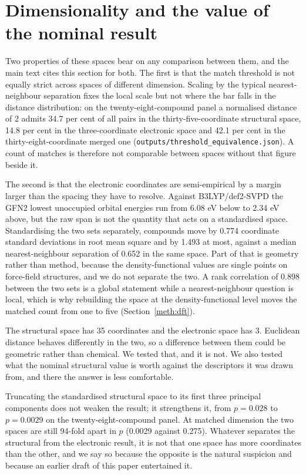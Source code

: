 \documentclass[11pt,a4paper]{article}
\begin{document}
\section{Dimensionality and the value of the nominal result}
\label{res:dimdetail}

Two properties of these spaces bear on any comparison between them, and the main
text cites this section for both. The first is that the match threshold is not
equally strict across spaces of different dimension. Scaling by the typical
nearest-neighbour separation fixes the local scale but not where the bar falls
in the distance distribution: on the twenty-eight-compound panel a normalised
distance of 2 admits 34.7 per cent of all pairs in the thirty-five-coordinate
structural space, 14.8 per cent in the three-coordinate electronic space and
42.1 per cent in the thirty-eight-coordinate merged one
(\texttt{outputs/\allowbreak threshold\_\allowbreak equivalence.json}). A count of matches is therefore
not comparable between spaces without that figure beside it.

The second is that the electronic coordinates are semi-empirical by a margin
larger than the spacing they have to resolve. Against B3LYP/def2-SVPD the GFN2
lowest unoccupied orbital energies run from 6.08 eV below to 2.34 eV above, but
the raw span is not the quantity that acts on a standardised space. Standardising
the two sets separately, compounds move by 0.774 coordinate standard deviations
in root mean square and by 1.493 at most, against a median nearest-neighbour
separation of 0.652 in the same space. Part of that is geometry rather than
method, because the density-functional values are single points on force-field
structures, and we do not separate the two. A rank correlation of 0.898 between
the two sets is a global statement while a nearest-neighbour question is local,
which is why rebuilding the space at the density-functional level moves the
matched count from one to five (Section~\ref{meth:dft}).

The structural space has 35 coordinates and the electronic space has 3. Euclidean
distance behaves differently in the two, so a difference between them could be
geometric rather than chemical. We tested that, and it is not. We also tested
what the nominal structural value is worth against the descriptors it was drawn
from, and there the answer is less comfortable.

Truncating the standardised structural space to its first three principal
components does not weaken the result; it strengthens it, from $p=0.028$ to
$p=0.0029$ on the twenty-eight-compound panel. At matched dimension the two
spaces are still 94-fold apart in $p$ (0.0029 against 0.275). Whatever separates
the structural from the electronic result, it is not that one space has more
coordinates than the other, and we say so because the opposite is the natural
suspicion and because an earlier draft of this paper entertained it.
\end{document}
